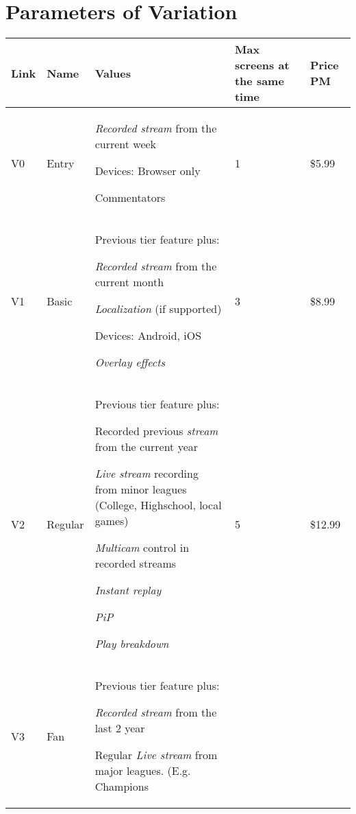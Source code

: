 \section{Parameters of Variation}
\begin{center}
\begin{tabular}{|p{}|p{}|p{}|p{}|p{}|}
\hline
	Link & Name & Values & Max screens at the same time & Price PM  \\ 
\hline
V0 & Entry & \begin{packed_enum}
	\small{
		\item \textit{Recorded stream} from the current week
		\item Devices: Browser only
		\item Commentators
	}
\end{packed_enum} & 1 & \$5.99 \\ 
\hline
V1 & Basic & Previous tier feature plus: \begin{packed_enum}
	\small{
		\item \textit{Recorded stream} from the current month
		\item\textit{Localization} (if supported)
		\item Devices: Android, iOS
		\item \textit{Overlay effects}
	}
\end{packed_enum} & 3 & \$8.99 \\ 
\hline
V2 & Regular & Previous tier feature plus: \begin{packed_enum}
	\small{
		\item Recorded previous \textit{stream} from the current year
		\item \textit{Live stream} recording from minor 
		leagues (College, Highschool, local games)
		\item \textit{Multicam} control in recorded streams
		\item \textit{Instant replay}
		\item \textit{PiP}
		\item \textit{Play breakdown}
	}
\end{packed_enum} & 5 & \$12.99 \\ 
\hline
V3 & Fan & Previous tier feature plus: \begin{packed_enum}
	\small{
		\item \textit{Recorded stream} from the last 2 year
		\item Regular \textit{Live stream} from major leagues. (E.g. Champions 
}
\end{packed_enum}
\end{tabular}
\end{center}
